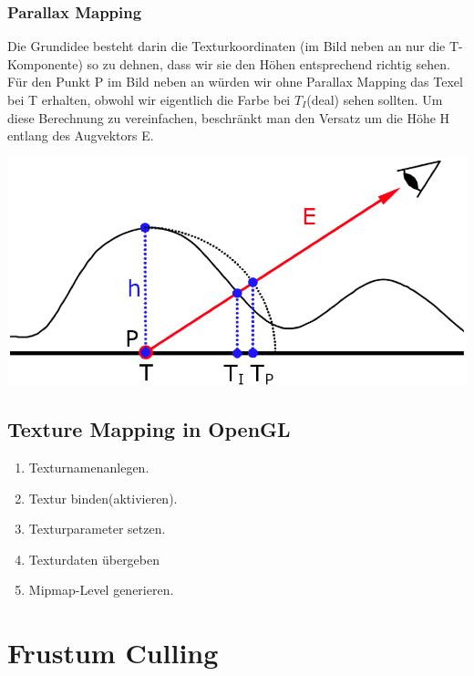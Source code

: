 \documentclass[10pt]{article}
\begin{document}
\subsubsection{Parallax Mapping}
Die Grundidee besteht darin die Texturkoordinaten (im Bild neben an nur die T-Komponente) so zu dehnen, dass wir sie den Höhen entsprechend richtig sehen. Für den Punkt P im Bild neben an würden wir ohne Parallax Mapping das Texel bei T erhalten, obwohl wir eigentlich die Farbe bei $T_I$(deal) sehen sollten. Um diese Berechnung zu vereinfachen, beschränkt man den Versatz um die Höhe H entlang des Augvektors E.
\begin{center}
	\includegraphics[scale=0.2]{parallax_mapping.png}
\end{center}

\subsection{Texture Mapping in OpenGL}
\begin{enumerate}
	\item Texturnamenanlegen.
	\item Textur binden(aktivieren). 
	\item Texturparameter setzen. 
	\item Texturdaten übergeben
	\item Mipmap-Level generieren.
\end{enumerate}

\newpage
\section{Frustum Culling}
\end{document}
